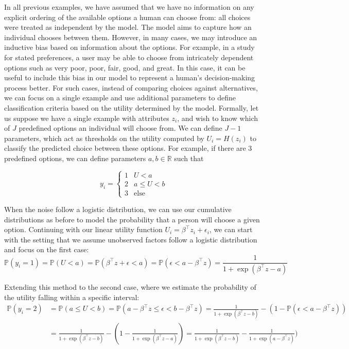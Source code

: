 \documentclass[
  letterpaper,
  numbers=noenddot,
  DIV=11]{scrreprt}
\theoremstyle{definition}
\theoremstyle{plain}
\theoremstyle{plain}
\theoremstyle{remark}
\begin{document}
In all previous examples, we have assumed that we have no information on
any explicit ordering of the available options a human can choose from:
all choices were treated as independent by the model. The model aims to
capture how an individual chooses between them. However, in many cases,
we may introduce an inductive bias based on information about the
options. For example, in a study for stated preferences, a user may be
able to choose from intricately dependent options such as very poor,
poor, fair, good, and great. In this case, it can be useful to include
this bias in our model to represent a human's decision-making process
better. For such cases, instead of comparing choices against
alternatives, we can focus on a single example and use additional
parameters to define classification criteria based on the utility
determined by the model. Formally, let us suppose we have a single
example with attributes \(z_i\), and wish to know which of \(J\)
predefined options an individual will choose from. We can define
\(J - 1\) parameters, which act as thresholds on the utility computed by
\(U_i = H(z_i)\) to classify the predicted choice between these options.
For example, if there are 3 predefined options, we can define parameters
\(a, b \in \mathbb{R}\) such that

\[
y_i =
\begin{cases} 
    1 & U < a \\
    2 & a \le U < b \\
    3 & \text{else}
\end{cases}
\]

When the noise follow a logistic distribution, we can use our cumulative
distributions as before to model the probability that a person will
choose a given option. Continuing with our linear utility function
\(U_i = \beta^\top z_i + \epsilon_i\), we can start with the setting
that we assume unobserved factors follow a logistic distribution and
focus on the first case:
\[\mathbb{P}(y_i = 1) = \mathbb{P}(U < a) = \mathbb{P}(\beta^\top z + \epsilon < a )  = \mathbb{P}( \epsilon < a - \beta^\top z)  = \frac{1}{1 + \exp(\beta^\top z - a)}\]

Extending this method to the second case, where we estimate the
probability of the utility falling within a specific interval:
\[\begin{aligned}
    \mathbb{P}(y_i = 2) & = \mathbb{P}(a \le U < b) = \mathbb{P}(a - \beta^\top z \le \epsilon < b - \beta^\top z) = \frac{1}{1 + \exp(\beta^\top z - b)}  - (1 - \mathbb{P}( \epsilon < a - \beta^\top z) ) \\
    & = \frac{1}{1 + \exp(\beta^\top z - b)}  - (1 - \frac{1}{1 + \exp(\beta^\top z - a)}  ) = \frac{1}{1 + \exp(\beta^\top z - b)}  - \frac{1}{1 + \exp(a - \beta^\top z)}  ) \\
\end{aligned}\]
\end{document}
